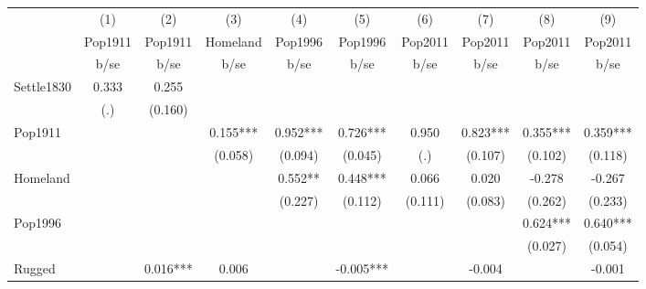 {
\def\sym#1{\ifmmode^{#1}\else\(^{#1}\)\fi}
\begin{tabular}{l*{9}{c}}
\hline\hline
                    &\multicolumn{1}{c}{(1)}&\multicolumn{1}{c}{(2)}&\multicolumn{1}{c}{(3)}&\multicolumn{1}{c}{(4)}&\multicolumn{1}{c}{(5)}&\multicolumn{1}{c}{(6)}&\multicolumn{1}{c}{(7)}&\multicolumn{1}{c}{(8)}&\multicolumn{1}{c}{(9)}\\
                    &\multicolumn{1}{c}{Pop1911}&\multicolumn{1}{c}{Pop1911}&\multicolumn{1}{c}{Homeland}&\multicolumn{1}{c}{Pop1996}&\multicolumn{1}{c}{Pop1996}&\multicolumn{1}{c}{Pop2011}&\multicolumn{1}{c}{Pop2011}&\multicolumn{1}{c}{Pop2011}&\multicolumn{1}{c}{Pop2011}\\
                    &        b/se   &        b/se   &        b/se   &        b/se   &        b/se   &        b/se   &        b/se   &        b/se   &        b/se   \\
\hline
Settle1830          &       0.333   &       0.255   &               &               &               &               &               &               &               \\
                    &         (.)   &     (0.160)   &               &               &               &               &               &               &               \\
Pop1911             &               &               &       0.155***&       0.952***&       0.726***&       0.950   &       0.823***&       0.355***&       0.359***\\
                    &               &               &     (0.058)   &     (0.094)   &     (0.045)   &         (.)   &     (0.107)   &     (0.102)   &     (0.118)   \\
Homeland            &               &               &               &       0.552** &       0.448***&       0.066   &       0.020   &      -0.278   &      -0.267   \\
                    &               &               &               &     (0.227)   &     (0.112)   &     (0.111)   &     (0.083)   &     (0.262)   &     (0.233)   \\
Pop1996             &               &               &               &               &               &               &               &       0.624***&       0.640***\\
                    &               &               &               &               &               &               &               &     (0.027)   &     (0.054)   \\
Rugged              &               &       0.016***&       0.006   &               &      -0.005***&               &      -0.004   &               &      -0.001   \\

\end{tabular}}
